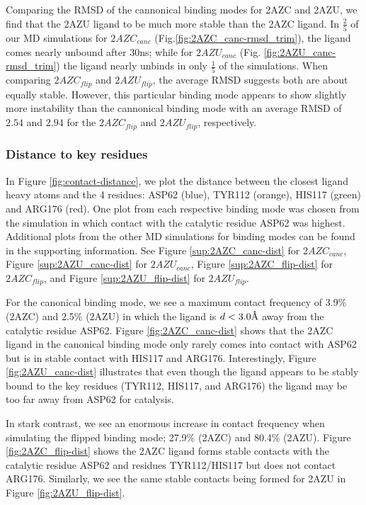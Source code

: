 \documentclass[fleqn,10pt]{wlscirep}
\newcommand{\angstrom}{\text{\normalfont\AA}}
\begin{document}
Comparing the RMSD of the cannonical binding modes for 2AZC and 2AZU, we find that the 2AZU ligand to be much more stable than the 2AZC ligand.
In $\frac{2}{5}$ of our MD simulations for $2AZC_{canc}$ (Fig.\ref{fig:2AZC_canc-rmsd_trim}), the ligand comes nearly unbound after 30ns; while for $2AZU_{canc}$ (Fig. \ref{fig:2AZU_canc-rmsd_trim}) the ligand nearly unbinds in only $\frac{1}{5}$ of the simulations.
When comparing $2AZC_{flip}$ and $2AZU_{flip}$, the average RMSD suggests both are about equally stable.
However, this particular binding mode appears to show slightly more instability than the cannonical binding mode with an average RMSD of $2.54$ and $2.94$ for the $2AZC_{flip}$ and $2AZU_{flip}$, respectively.

\subsubsection{Distance to key residues}

In Figure \ref{fig:contact-distance}, we plot the distance between the closest ligand heavy atoms and the 4 residues: ASP62 (blue), TYR112 (orange), HIS117 (green) and ARG176 (red).
One plot from each respective binding mode was chosen from the simulation in which contact with the catalytic residue ASP62 was highest.
Additional plots from the other MD simulations for binding modes can be found in the supporting information.
See Figure \ref{sup:2AZC_canc-dist} for $2AZC_{canc}$, Figure \ref{sup:2AZU_canc-dist} for $2AZU_{canc}$, Figure \ref{sup:2AZC_flip-dist} for $2AZC_{flip}$, and Figure \ref{sup:2AZU_flip-dist} for $2AZU_{flip}$.

For the canonical binding mode, we see a maximum contact frequency of 3.9\% (2AZC) and 2.5\% (2AZU) in which the ligand is $d<3.0\angstrom$ away from the catalytic residue ASP62.
Figure \ref{fig:2AZC_canc-dist} shows that the 2AZC ligand in the canonical binding mode only rarely comes into contact with ASP62 but is in stable contact with HIS117 and ARG176.  
Interestingly, Figure \ref{fig:2AZU_canc-dist} illustrates that even though the ligand appears to be stably bound to the key residues (TYR112, HIS117, and ARG176) the ligand may be too far away from ASP62 for catalysis.

In stark contrast, we see an enormous increase in contact frequency when simulating the flipped binding mode; 27.9\% (2AZC) and 80.4\% (2AZU).
Figure \ref{fig:2AZC_flip-dist} shows the 2AZC ligand forms stable contacts with the catalytic residue ASP62 and residues TYR112/HIS117 but does not contact ARG176.
Similarly, we see the same stable contacts being formed for 2AZU in Figure \ref{fig:2AZU_flip-dist}.
\end{document}
